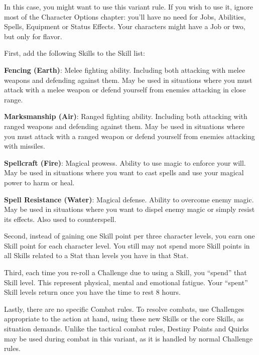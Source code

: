 \begin{multicols}{2}
In this case, you might want to use this
variant rule. If you wish to use it, ignore most of
the Character Options chapter: you'll have no
need for Jobs, Abilities, Spells, Equipment or
Status Effects. Your characters might have a Job
or two, but only for flavor.

First, add the following Skills to the Skill
list:

\textbf{Fencing (Earth)}: Melee fighting ability.
Including both attacking with melee weapons
and defending against them. May be used in
situations where you must attack with a melee
weapon or defend yourself from enemies
attacking in close range.

\textbf{Marksmanship (Air)}: Ranged fighting
ability. Including both attacking with ranged
weapons and defending against them. May be
used in situations where you must attack with a
ranged weapon or defend yourself from enemies
attacking with missiles.

\textbf{Spellcraft (Fire)}: Magical prowess. Ability
to use magic to enforce your will. May be used in
situations where you want to cast spells and use
your magical power to harm or heal.

\textbf{Spell Resistance (Water)}: Magical defense.
Ability to overcome enemy magic. May be used
in situations where you want to dispel enemy
magic or simply resist its effects. Also used to
counterspell.

Second, instead of gaining one Skill point
per three character levels, you earn one Skill
point for each character level. You still may not
spend more Skill points in all Skills related to a
Stat than levels you have in that Stat.

Third, each time you re-roll a Challenge
due to using a Skill, you “spend” that Skill level.
This represent physical, mental and emotional
fatigue. Your “spent” Skill levels return once you
have the time to rest 8 hours.

Lastly, there are no specific Combat rules.
To resolve combats, use Challenges appropriate
to the action at hand, using these new Skills or
the core Skills, as situation demands. Unlike the
tactical combat rules, Destiny Points and Quirks
may be used during combat in this variant, as it
is handled by normal Challenge rules.


\end{multicols}
